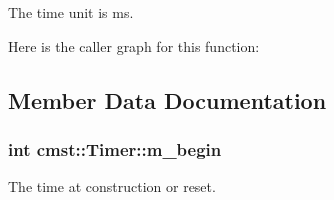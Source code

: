 The time unit is ms. 

Here is the caller graph for this function:




\subsection{Member Data Documentation}
\subsubsection[{\texorpdfstring{m\_begin}{m_begin}}]{\setlength{\rightskip}{0pt plus 5cm}int cmst::Timer::m\_begin\hspace{0.3cm}{\ttfamily [private]}}\hypertarget{classcmst_1_1_timer_a0fa8671c0b1dc3efca0f4dc5dfe98fc2}{}\label{classcmst_1_1_timer_a0fa8671c0b1dc3efca0f4dc5dfe98fc2}


The time at construction or reset. 

